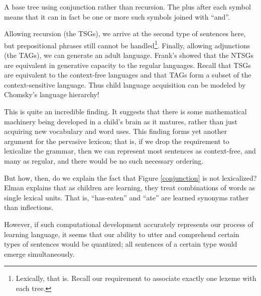 \documentclass[12pt]{article}
\begin{document}
\begin{Figure}
\begin{center}
\end{center}
\caption{A base tree using conjunction rather than recursion.  The plus
after each symbol means that it can in fact be one or more such symbols
joined with ``and''.}
\label{conjunction}
\end{Figure}

Allowing recursion (the TSGs), we arrive at the second type of sentences
here, but prepositional phrases still cannot be
handled\footnote{Lexically, that is.  Recall our requirement to
associate exactly one lexeme with each tree.}.  Finally, allowing
adjunctions (the TAGs), we can generate an adult language.  Frank's
showed that the NTSGs are equivalent in generative capacity to the
regular languages.  Recall that TSGs are equivalent to the context-free
languages and that TAGs form a subset of the context-sensitive language.
Thus child language acquisition can be modeled by Chomsky's language
hierarchy!

This is quite an incredible finding.  It suggests that there is some
mathematical machinery being developed in a child's brain as it matures,
rather than just acquiring new vocabulary and word uses.  This finding
forms yet another argument for the pervasive lexicon; that is, if we
drop the requirement to lexicalize the grammar, then we can represent
most sentences as context-free, and many as regular, and there would be
no such necessary ordering.

But how, then, do we explain the fact that Figure \ref{conjunction} is
not lexicalized?  Elman \cite{Elman-1990} explains that as children are
learning, they treat combinations of words as single lexical units.
That is, ``has-eaten'' and ``ate'' are learned synonyms rather than
inflections.

However, if such computational development accurately represents our
process of learning language, it seems that our ability to utter and
comprehend certain types of sentences would be quantized; all sentences
of a certain type would emerge simultaneously.

\clearpage
\end{document}
